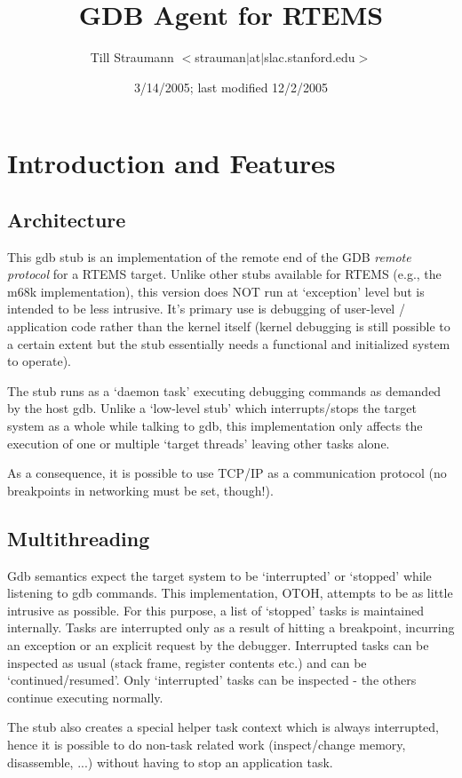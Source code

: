 \documentclass{article}
\title{GDB Agent for RTEMS}
\author{Till Straumann $<$strauman$|$at$|$slac.stanford.edu$>$}
\date{3/14/2005; last modified 12/2/2005\\
\nix
}
\begin{document}
\maketitle
\tableofcontents

\section{Introduction and Features}

\subsection{Architecture}

This gdb stub is an implementation of the remote end of the
GDB {\em remote protocol} for a RTEMS target. Unlike other stubs
available for RTEMS (e.g., the m68k implementation), this
version does NOT run at `exception' level but is intended to
be less intrusive. It's primary use is debugging of user-level
/ application code rather than the kernel itself (kernel
debugging is still possible to a certain extent but the stub
essentially needs a functional and initialized system to
operate).

The stub runs as a `daemon task' executing debugging commands
as demanded by the host gdb. Unlike a `low-level stub' which
interrupts/stops the target system as a whole while talking
to gdb, this implementation only affects the execution of
one or multiple `target threads' leaving other tasks alone.

As a consequence, it is possible to use TCP/IP as a communication
protocol (no breakpoints in networking must be set, though!).

\subsection{Multithreading}
Gdb semantics expect the target system to be `interrupted' or
`stopped' while listening to gdb commands. This implementation,
OTOH, attempts to be as little intrusive as possible. For this
purpose, a list of `stopped' tasks is maintained internally.
Tasks are interrupted only as a result of hitting a breakpoint,
incurring an exception or an explicit request by the debugger.
Interrupted tasks can be inspected as usual (stack frame,
register contents etc.) and can be `continued/resumed'.
Only `interrupted' tasks can be inspected - the others continue
executing normally.

The stub also creates a special helper task context which is
always interrupted, hence it is possible to do non-task related
work (inspect/change memory, disassemble, ...) without having
to stop an application task.
\end{document}
